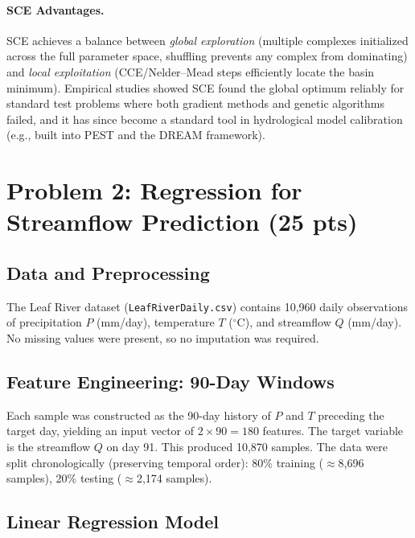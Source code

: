 \documentclass[11pt,letterpaper]{article}
\begin{document}
\paragraph{SCE Advantages.}
SCE achieves a balance between \emph{global exploration} (multiple complexes initialized across the full parameter space, shuffling prevents any complex from dominating) and \emph{local exploitation} (CCE/Nelder--Mead steps efficiently locate the basin minimum). Empirical studies showed SCE found the global optimum reliably for standard test problems where both gradient methods and genetic algorithms failed, and it has since become a standard tool in hydrological model calibration (e.g., built into PEST and the DREAM framework).

\clearpage
\section{Problem 2: Regression for Streamflow Prediction (25 pts)}

\subsection{Data and Preprocessing}

The Leaf River dataset (\texttt{LeafRiverDaily.csv}) contains 10{,}960 daily observations of precipitation $P$ (mm/day), temperature $T$ ($^\circ$C), and streamflow $Q$ (mm/day).  No missing values were present, so no imputation was required.

\subsection{Feature Engineering: 90-Day Windows}

Each sample was constructed as the 90-day history of $P$ and $T$ preceding the target day, yielding an input vector of $2 \times 90 = 180$ features. The target variable is the streamflow $Q$ on day 91. This produced 10{,}870 samples. The data were split chronologically (preserving temporal order): 80\% training ($\approx$8{,}696 samples), 20\% testing ($\approx$2{,}174 samples).

\subsection{Linear Regression Model}
\end{document}
